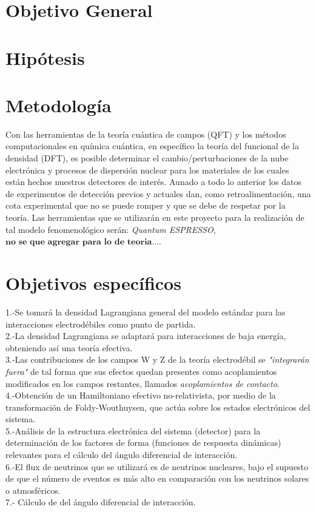 \documentclass[final,12p]{article}
\begin{document}
\section{Objetivo General}



\section{Hip\'otesis}



\section{Metodolog\'ia}

Con las herramientas de la teor\'ia cu\'antica de campos (QFT) y los m\'etodos computacionales en qu\'imica cu\'antica, en espec\'ifico la teor\'ia del funcional de la densidad (DFT), es posible determinar el cambio/perturbaciones de la nube electr\'onica y procesos de dispersi\'on nuclear para los materiales de los cuales est\'an hechos nuestros detectores de inter\'es. Aunado a todo lo anterior los datos de experimentos de detecci\'on previos y actuales dan, como retroalimentaci\'on, una cota experimental que no se puede romper y que se debe de respetar por la teor\'ia. Las herramientas que se utilizar\'an en este proyecto para la realizaci\'on de tal modelo fenomenol\'ogico ser\'an: \emph{Quantum ESPRESSO}, $\mathbf{no\,\,se\,\,que\,\,agregar\,\,para\,\,lo\,\,de\,\,teoria}$....

\section{Objetivos espec\'ificos}

1.-Se tomar\'a la densidad Lagrangiana general del modelo est\'andar para las interacciones electrod\'ebiles como punto de partida.
\\
2.-La densidad Lagrangiana se adaptar\'a para interacciones de baja energ\'ia, obteniendo as\'i una teor\'ia efectiva.
\\
3.-Las contribuciones de los campos W y Z de la teor\'ia electrod\'ebil se \emph{"integrar\'an fuera"} de tal forma que sus efectos quedan presentes como acoplamientos modificados en los campos restantes, llamados \emph{acoplamientos de contacto}.
\\
4.-Obtenci\'on de un Hamiltoniano efectivo no-relativista, por medio de la transformaci\'on de Foldy-Wouthuysen, que act\'ua sobre los estados electr\'onicos del sistema.
\\
5.-An\'alisis de la estructura electr\'onica del sistema (detector) para la determinaci\'on de los factores de forma (funciones de respuesta din\'amicas) relevantes para el c\'alculo del \'angulo diferencial de interacci\'on.
\\
6.-El flux de neutrinos que se utilizar\'a es de neutrinos nucleares, bajo el supuesto de que el n\'umero de eventos es m\'as alto en comparaci\'on con los neutrinos solares o atmosf\'ericos.
\\
7.- C\'alculo de del \'angulo diferencial de interacci\'on.
\\
\end{document}
